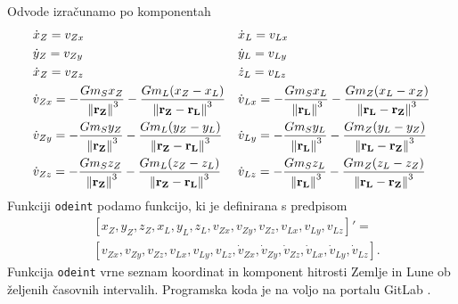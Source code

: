 \documentclass[a4paper,12pt]{article}
\renewcommand{\vec}[1]{\mathbf{#1}} %
\begin{document}
\noindent
Odvode izračunamo po komponentah
\begin{align*}
    &\dot{x}_Z = v_{Zx} & &\dot{x}_L = v_{Lx} \\
    &\dot{y}_Z = v_{Zy} & &\dot{y}_L = v_{Ly} \\
    &\dot{x}_Z = v_{Zz} & &\dot{z}_L = v_{Lz} \\
    &\dot{v}_{Zx} = - \frac{Gm_Sx_Z}{\: \norm{\vec{r_Z}}^3} - \frac{Gm_L(x_Z-x_L)}{\norm{\vec{r_Z}-\vec{r_L}}^3} & &\dot{v}_{Lx} = - \frac{Gm_Sx_L}{\: \norm{\vec{r_L}}^3} - \frac{Gm_Z(x_L-x_Z)}{\norm{\vec{r_L}-\vec{r_Z}}^3} \\
    &\dot{v}_{Zy} = - \frac{Gm_Sy_Z}{\: \norm{\vec{r_Z}}^3} - \frac{Gm_L(y_Z-y_L)}{\norm{\vec{r_Z}-\vec{r_L}}^3} & &\dot{v}_{Ly} = - \frac{Gm_Sy_L}{\: \norm{\vec{r_L}}^3} - \frac{Gm_Z(y_L-y_Z)}{\norm{\vec{r_L}-\vec{r_Z}}^3} \\
    &\dot{v}_{Zz} = - \frac{Gm_Sz_Z}{\: \norm{\vec{r_Z}}^3} - \frac{Gm_L(z_Z-z_L)}{\norm{\vec{r_Z}-\vec{r_L}}^3} & &\dot{v}_{Lz} = - \frac{Gm_Sz_L}{\: \norm{\vec{r_L}}^3} - \frac{Gm_Z(z_L-z_Z)}{\norm{\vec{r_L}-\vec{r_Z}}^3}
\end{align*}
Funkciji \texttt{odeint} podamo funkcijo, ki je definirana s predpisom
\begin{eqnarray}
    &\left[x_Z, y_Z, z_Z, x_L, y_L, z_L, v_{Zx}, v_{Zy}, v_{Zz}, v_{Lx}, v_{Ly}, 
    v_{Lz}\right]' = \nonumber \\ 
    &\left[v_{Zx}, v_{Zy}, v_{Zz}, v_{Lx}, v_{Ly}, v_{Lz}, \dot{v}_{Zx}, 
    \dot{v}_{Zy}, \dot{v}_{Zz}, \dot{v}_{Lx}, \dot{v}_{Ly}, 
    \dot{v}_{Lz}\right]. \nonumber
\end{eqnarray}
Funkcija \texttt{odeint} vrne seznam koordinat in komponent hitrosti Zemlje in 
Lune ob željenih časovnih intervalih. Programska koda je na voljo na portalu 
GitLab \cite{repo}.
\end{document}
